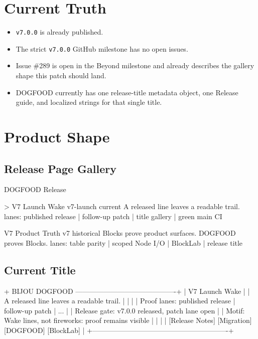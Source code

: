 \section{Current Truth}\label{record-112-current-truth}

\begin{itemize}
\tightlist
\item
  \texttt{v\allowbreak{}7\allowbreak{}.\allowbreak{}0\allowbreak{}.\allowbreak{}0} is already published.
\item
  The strict \texttt{v\allowbreak{}7\allowbreak{}.\allowbreak{}0\allowbreak{}.\allowbreak{}0} GitHub milestone has no open issues.
\item
  Issue \#289 is open in the Beyond milestone and already describes the gallery shape this patch should land.
\item
  DOGFOOD currently has one release-title metadata object, one Release guide, and localized strings for that single title.
\end{itemize}

\section{Product Shape}\label{record-112-product-shape}

\subsection{Release Page Gallery}\label{record-112-release-page-gallery}

\begin{CodeBlock}
DOGFOOD Release

> V7 Launch Wake        v7-launch   current
  A released line leaves a readable trail.
  lanes: published release | follow-up patch | title gallery | green main CI

  V7 Product Truth      v7          historical
  Blocks prove product surfaces. DOGFOOD proves Blocks.
  lanes: table parity | scoped Node I/O | BlockLab | release title
\end{CodeBlock}

\subsection{Current Title}\label{record-112-current-title}

\begin{CodeBlock}
+ BIJOU DOGFOOD -------------------------------------------+
| V7 Launch Wake                                           |
| A released line leaves a readable trail.                 |
|                                                          |
| Proof lanes: published release | follow-up patch | ...   |
| Release gate: v7.0.0 released, patch lane open           |
| Motif: Wake lines, not fireworks: proof remains visible  |
|                                                          |
| [Release Notes] [Migration] [DOGFOOD] [BlockLab]         |
+----------------------------------------------------------+
\end{CodeBlock}

